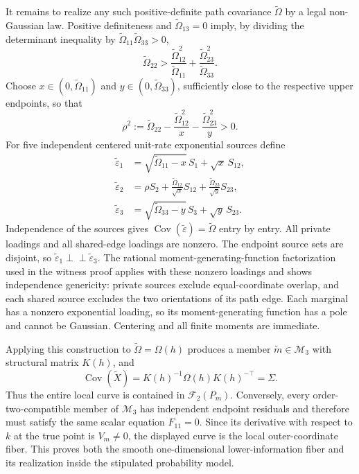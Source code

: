 It remains to realize any such positive-definite path covariance \(\widetilde\Omega\) by a legal non-Gaussian law. Positive definiteness and \(\widetilde\Omega_{13}=0\) imply, by dividing the determinant inequality by \(\widetilde\Omega_{11}\widetilde\Omega_{33}>0\),
\[
\widetilde\Omega_{22}>
\frac{\widetilde\Omega_{12}^2}{\widetilde\Omega_{11}}
+\frac{\widetilde\Omega_{23}^2}{\widetilde\Omega_{33}}.
\]
Choose \(x\in(0,\widetilde\Omega_{11})\) and \(y\in(0,\widetilde\Omega_{33})\), sufficiently close to the respective upper endpoints, so that
\[
\rho^2:=\widetilde\Omega_{22}
-\frac{\widetilde\Omega_{12}^2}{x}
-\frac{\widetilde\Omega_{23}^2}{y}>0.
\]
For five independent centered unit-rate exponential sources define
\[
\begin{aligned}
\widetilde\varepsilon_1
 &=\sqrt{\widetilde\Omega_{11}-x}\,S_1+\sqrt{x}\,S_{12},\\
\widetilde\varepsilon_2
 &=\rho S_2+\frac{\widetilde\Omega_{12}}{\sqrt{x}}S_{12}
                 +\frac{\widetilde\Omega_{23}}{\sqrt{y}}S_{23},\\
\widetilde\varepsilon_3
 &=\sqrt{\widetilde\Omega_{33}-y}\,S_3+\sqrt{y}\,S_{23}.
\end{aligned}
\]
Independence of the sources gives \(\operatorname{Cov}(\widetilde\varepsilon)=\widetilde\Omega\) entry by entry. All private loadings and all shared-edge loadings are nonzero. The endpoint source sets are disjoint, so \(\widetilde\varepsilon_1\perp\!\!\!\perp\widetilde\varepsilon_3\). The rational moment-generating-function factorization used in the witness proof applies with these nonzero loadings and shows independence genericity: private sources exclude equal-coordinate overlap, and each shared source excludes the two orientations of its path edge. Each marginal has a nonzero exponential loading, so its moment-generating function has a pole and cannot be Gaussian. Centering and all finite moments are immediate.

Applying this construction to \(\widetilde\Omega=\Omega(h)\) produces a member \(\widetilde m\in\mathcal M_3\) with structural matrix \(K(h)\), and
\[
\operatorname{Cov}(\widetilde X)
=K(h)^{-1}\Omega(h)K(h)^{-\top}=\Sigma.
\]
Thus the entire local curve is contained in \(\mathcal F_2(P_m)\). Conversely, every order-two-compatible member of \(\mathcal M_3\) has independent endpoint residuals and therefore must satisfy the same scalar equation \(F_{11}=0\). Since its derivative with respect to \(k\) at the true point is \(V_m\neq0\), the displayed curve is the local outer-coordinate fiber. This proves both the smooth one-dimensional lower-information fiber and its realization inside the stipulated probability model.

